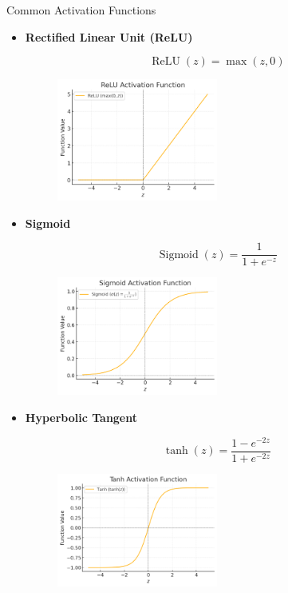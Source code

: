 \begin{frame}[allowframebreaks]

\begin{mydefinitionblock}{4.3}{Common Activation Functions}
    \begin{itemize}
        \item
        \textbf{Rectified Linear Unit (ReLU)}

        $$
        \operatorname{ReLU}(z)=\max (z, 0)
        $$

        \begin{figure}[H]
            \centering
            \includegraphics[width=0.5\textwidth]{.././assets/4.3.png}
        \end{figure}
        \item
        \textbf{Sigmoid}

        $$
        \operatorname{Sigmoid}(z)=\frac{1}{1+e^{-z}}
        $$

        \begin{figure}[H]
            \centering
            \includegraphics[width=0.5\textwidth]{.././assets/4.4.png}
        \end{figure}
        \item
        \textbf{Hyperbolic Tangent}

        $$
        \tanh (z)=\frac{1-e^{-2 z}}{1+e^{-2 z}}
        $$

        \begin{figure}[H]
            \centering
            \includegraphics[width=0.5\textwidth]{.././assets/4.5.png}
        \end{figure}
    \end{itemize}
\end{mydefinitionblock}


\end{frame}
